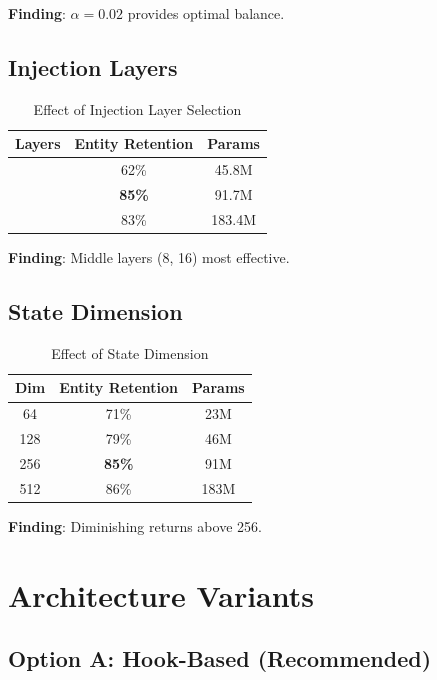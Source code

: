 \documentclass[11pt,a4paper]{article}
\begin{document}
\textbf{Finding}: $\alpha=0.02$ provides optimal balance.

\subsection{Injection Layers}

\begin{table}[h]
\centering
\caption{Effect of Injection Layer Selection}
\begin{tabular}{@{}ccc@{}}
\toprule
\textbf{Layers} & \textbf{Entity Retention} & \textbf{Params} \\
\midrule
[0] & 62\% & 45.8M \\
[8, 16] & \textbf{85\%} & 91.7M \\
[0, 8, 16, 24] & 83\% & 183.4M \\
\bottomrule
\end{tabular}
\end{table}

\textbf{Finding}: Middle layers (8, 16) most effective.

\subsection{State Dimension}

\begin{table}[h]
\centering
\caption{Effect of State Dimension}
\begin{tabular}{@{}ccc@{}}
\toprule
\textbf{Dim} & \textbf{Entity Retention} & \textbf{Params} \\
\midrule
64 & 71\% & 23M \\
128 & 79\% & 46M \\
256 & \textbf{85\%} & 91M \\
512 & 86\% & 183M \\
\bottomrule
\end{tabular}
\end{table}

\textbf{Finding}: Diminishing returns above 256.

\section{Architecture Variants}

\subsection{Option A: Hook-Based (Recommended)}
\end{document}
